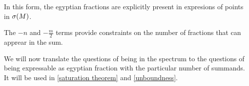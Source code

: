 In this form, the egyptian fractions are explicitly present in expresions of 
points in ${{\sigma}(M)}$.

The $-n$ and $-\frac{m}{2}$ terms provide constraints on the number of fractions that 
can apprear in the sum.

We will now translate the questions of being in the spectrum 
to the questions of being expressable as egyptian fraction with the particular number 
of summands. It will be used in \ref{saturation theorem} and \ref{unboundness}.

%

